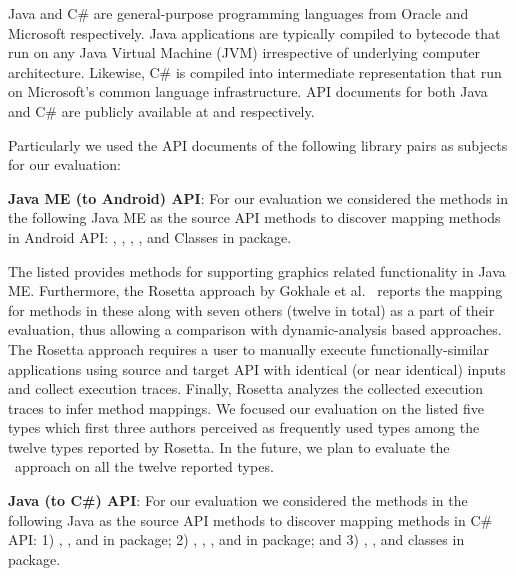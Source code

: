 Java and C\# are general-purpose programming languages from Oracle and Microsoft respectively. Java applications are typically compiled to bytecode that run on any Java Virtual Machine (JVM) irrespective of underlying computer architecture.
Likewise, C\# is compiled into intermediate representation that run on Microsoft's common language infrastructure.
API documents for both Java and C\# are publicly available at \cite{javaAPI} and \cite{dotNETAPI} respectively.


Particularly we used the API documents of the following library pairs as subjects for our evaluation: 


\textbf{Java ME (to Android) API}:
For our evaluation we considered the methods in the following Java ME  as the source API methods to discover mapping methods in Android API: 
,
,
,
, and
Classes in  package.


The listed  provides methods for supporting graphics related functionality in Java ME.
Furthermore, the Rosetta approach by Gokhale et al.~\cite{Gokhale2013ICSE} reports the
mapping for methods in these  along with seven others (twelve  in total) as a part of their evaluation,
thus allowing a comparison with dynamic-analysis based approaches.
The Rosetta approach requires a user to manually execute functionally-similar applications using source and target API with identical (or near identical) inputs and collect execution traces.
Finally, Rosetta analyzes the collected execution traces to infer method mappings.
We focused our evaluation on the listed five types which first three authors perceived as frequently used types among the twelve types reported by Rosetta.
In the future, we plan to evaluate the \tool\ approach on all the twelve reported types. 

\textbf{Java (to C\#) API}:
For our evaluation we considered the methods in the following Java  as the source API methods to discover mapping methods in C\# API: 
1) ,
, and 
 in  package;
2) ,
,
, and 
 in  package; and
3) ,
, and 
 classes in  package.
 
